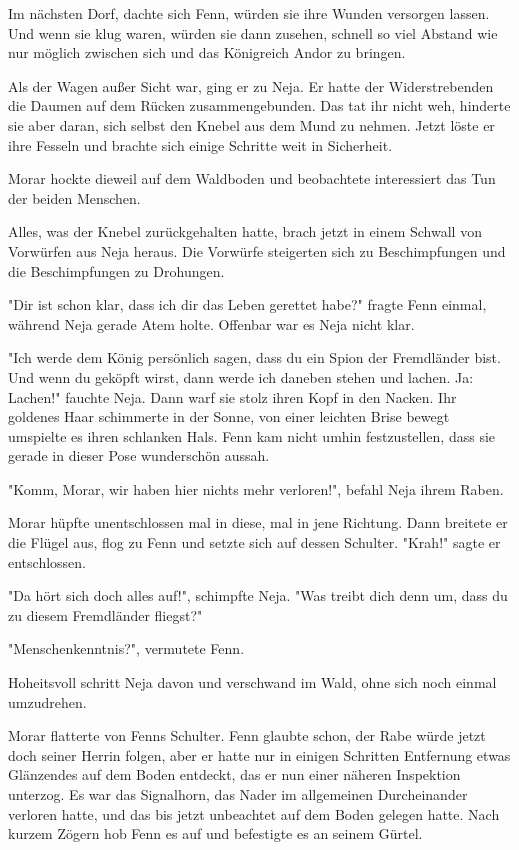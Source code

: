 \documentclass[10pt, a4paper, oneside]{book}
\begin{document}
\begin{multicols}{2}
Im nächsten Dorf, dachte sich Fenn, würden sie ihre Wunden versorgen lassen. Und wenn sie klug waren, würden sie dann zusehen, schnell so viel Abstand wie nur möglich zwischen sich und das Königreich Andor zu bringen.

Als der Wagen außer Sicht war, ging er zu Neja. Er hatte der Widerstrebenden die Daumen auf dem Rücken zusammengebunden. Das tat ihr nicht weh, hinderte sie aber daran, sich selbst den Knebel aus dem Mund zu nehmen. Jetzt löste er ihre Fesseln und brachte sich einige Schritte weit in Sicherheit.

Morar hockte dieweil auf dem Waldboden und beobachtete interessiert das Tun der beiden Menschen.

Alles, was der Knebel zurückgehalten hatte, brach jetzt in einem Schwall von Vorwürfen aus Neja heraus. Die Vorwürfe steigerten sich zu Beschimpfungen und die Beschimpfungen zu Drohungen.

"Dir ist schon klar, dass ich dir das Leben gerettet habe?" fragte Fenn einmal, während Neja gerade Atem holte. Offenbar war es Neja nicht klar.

"Ich werde dem König persönlich sagen, dass du ein Spion der Fremdländer bist. Und wenn du geköpft wirst, dann werde ich daneben stehen und lachen. Ja: Lachen!" fauchte Neja. Dann warf sie stolz ihren Kopf in den Nacken. Ihr goldenes Haar schimmerte in der Sonne, von einer leichten Brise bewegt umspielte es ihren schlanken Hals. Fenn kam nicht umhin festzustellen, dass sie gerade in dieser Pose wunderschön aussah.

"Komm, Morar, wir haben hier nichts mehr verloren!", befahl Neja ihrem Raben.

Morar hüpfte unentschlossen mal in diese, mal in jene Richtung. Dann breitete er die Flügel aus, flog zu Fenn und setzte sich auf dessen Schulter. "Krah!" sagte er entschlossen.

"Da hört sich doch alles auf!", schimpfte Neja. "Was treibt dich denn um, dass du zu diesem Fremdländer fliegst?"

"Menschenkenntnis?", vermutete Fenn.

Hoheitsvoll schritt Neja davon und verschwand im Wald, ohne sich noch einmal umzudrehen.

Morar flatterte von Fenns Schulter. Fenn glaubte schon, der Rabe würde jetzt doch seiner Herrin folgen, aber er hatte nur in einigen Schritten Entfernung etwas Glänzendes auf dem Boden entdeckt, das er nun einer näheren Inspektion unterzog. Es war das Signalhorn, das Nader im allgemeinen Durcheinander verloren hatte, und das bis jetzt unbeachtet auf dem Boden gelegen hatte. Nach kurzem Zögern hob Fenn es auf und befestigte es an seinem Gürtel.


\end{multicols}
\end{document}
